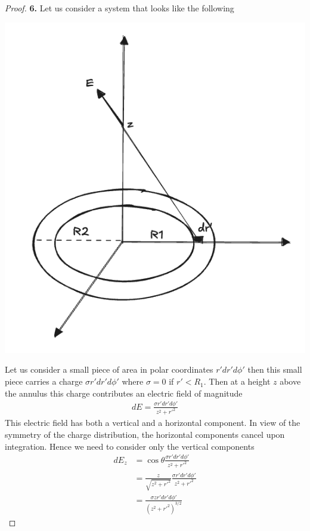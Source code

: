 \documentclass[11pt]{article}
\theoremstyle{definition}
\begin{document}
\begin{proof}{\textbf{6.}}
    Let us consider a system that looks like the following
    \begin{center}
        \includegraphics*[scale=0.35]{ch2-6.png}
    \end{center}
    Let us consider a small piece of area in polar coordinates $r'dr'd\phi'$
    then this small piece carries a charge $\sigma r'dr'd\phi'$ where 
    $\sigma =0$ if $r' < R_1$. Then at a height $z$ above the annulus
    this charge contributes an electric field of magnitude
    \begin{align*}
        dE = \frac{\sigma r' dr' d\phi'}{z^2 + r'^2}
    \end{align*}
    This electric field has both a vertical and a horizontal component.
    In view of the symmetry of the charge distribution, the horizontal
    components cancel upon integration. Hence we need to consider only
    the vertical components
    \begin{align*}
        dE_z &= \cos\theta\frac{\sigma r' dr' d\phi'}{z^2 + r'^2}\\
        &= \frac{z}{\sqrt{z^2 + r'^2}}\frac{\sigma r' dr' d\phi'}{z^2 + r'^2}\\
        &= \frac{\sigma zr' dr' d\phi'}{(z^2 + r'^2)^{3/2}}

\end{align*}
\end{proof}
\end{document}
